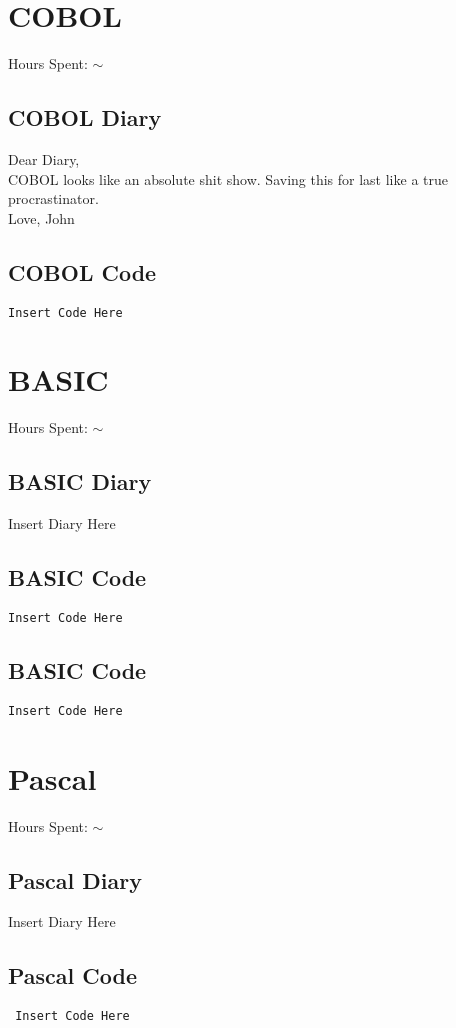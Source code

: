 \documentclass{report}
\begin{document}
\section*{COBOL}
Hours Spent: $\sim$
\subsection*{COBOL Diary}
Dear Diary,
\\
COBOL looks like an absolute shit show. Saving this for last like a true procrastinator.
\\
Love, John

\subsection*{COBOL Code}
\begin{lstlisting}
Insert Code Here
\end{lstlisting}


\section*{BASIC}
Hours Spent: $\sim$
\subsection{BASIC Diary}
Insert Diary Here

\subsection*{BASIC Code}
\begin{lstlisting}
Insert Code Here
\end{lstlisting}


\subsection*{BASIC Code}
\begin{lstlisting}
Insert Code Here
\end{lstlisting}


\section*{Pascal}
Hours Spent: $\sim$
\subsection{Pascal Diary}
Insert Diary Here

\subsection*{Pascal Code}
\begin{lstlisting}
 Insert Code Here
\end{lstlisting}
\end{document}
